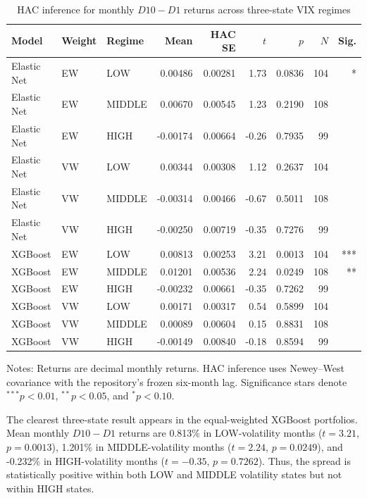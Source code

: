 \begin{table}[htbp]
\centering
\caption{HAC inference for monthly $D10-D1$ returns across three-state VIX regimes}
\label{tab:three-state-long-short-inference}
\small
\begin{tabular}{lllrrrrrr}
\hline
Model & Weight & Regime & Mean & HAC SE & $t$ & $p$ & $N$ & Sig. \\
\hline
Elastic Net & EW & LOW    &  0.00486 & 0.00281 &  1.73 & 0.0836 & 104 & * \\
Elastic Net & EW & MIDDLE &  0.00670 & 0.00545 &  1.23 & 0.2190 & 108 &  \\
Elastic Net & EW & HIGH   & -0.00174 & 0.00664 & -0.26 & 0.7935 &  99 &  \\
Elastic Net & VW & LOW    &  0.00344 & 0.00308 &  1.12 & 0.2637 & 104 &  \\
Elastic Net & VW & MIDDLE & -0.00314 & 0.00466 & -0.67 & 0.5011 & 108 &  \\
Elastic Net & VW & HIGH   & -0.00250 & 0.00719 & -0.35 & 0.7276 &  99 &  \\
XGBoost     & EW & LOW    &  0.00813 & 0.00253 &  3.21 & 0.0013 & 104 & *** \\
XGBoost     & EW & MIDDLE &  0.01201 & 0.00536 &  2.24 & 0.0249 & 108 & ** \\
XGBoost     & EW & HIGH   & -0.00232 & 0.00661 & -0.35 & 0.7262 &  99 &  \\
XGBoost     & VW & LOW    &  0.00171 & 0.00317 &  0.54 & 0.5899 & 104 &  \\
XGBoost     & VW & MIDDLE &  0.00089 & 0.00604 &  0.15 & 0.8831 & 108 &  \\
XGBoost     & VW & HIGH   & -0.00149 & 0.00840 & -0.18 & 0.8594 &  99 &  \\
\hline
\end{tabular}
\begin{flushleft}
\small
Notes: Returns are decimal monthly returns. HAC inference uses Newey--West covariance with the repository's frozen six-month lag. Significance stars denote $^{***}p<0.01$, $^{**}p<0.05$, and $^{*}p<0.10$.
\end{flushleft}
\end{table}

The clearest three-state result appears in the equal-weighted XGBoost portfolios. Mean monthly $D10-D1$ returns are 0.813\% in LOW-volatility months ($t=3.21$, $p=0.0013$), 1.201\% in MIDDLE-volatility months ($t=2.24$, $p=0.0249$), and -0.232\% in HIGH-volatility months ($t=-0.35$, $p=0.7262$). Thus, the spread is statistically positive within both LOW and MIDDLE volatility states but not within HIGH states.

